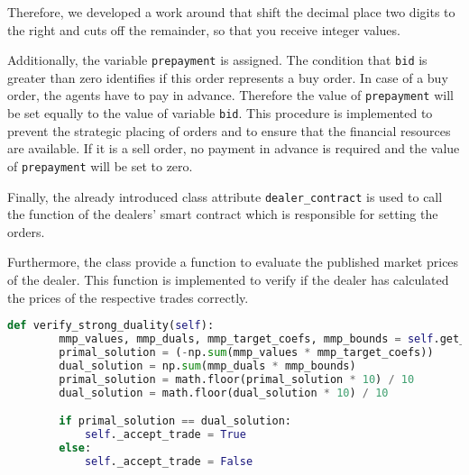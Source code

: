 Therefore, we developed a work around that shift the decimal place two digits to the right and cuts off the remainder,
so that you receive integer values. 

Additionally, the variable \verb|prepayment| is assigned. 
The condition that \verb|bid| is greater than zero identifies if this order represents a buy order.
In case of a buy order, the agents have to pay in advance.
Therefore the value of \verb|prepayment| will be set equally to the value of variable \verb|bid|. 
This procedure is implemented to prevent the strategic placing of orders and to ensure that the financial resources are available.
If it is a sell order, no payment in advance is required and the value of \verb|prepayment| will be set to zero.

Finally, the already introduced class attribute \verb|dealer_contract| is used to call the function of the dealers' smart contract which is
responsible for setting the orders.

Furthermore, the class provide a function to evaluate the published market prices of the dealer. 
This function is implemented to verify if the dealer has calculated the prices of the respective trades 
correctly.  

\begin{lstlisting}[float=htbp, label=lst:verify_trade, caption=Verification of trades, language=Python]
    def verify_strong_duality(self):
        mmp_values, mmp_duals, mmp_target_coefs, mmp_bounds = self.get_mmp_attributes()
        primal_solution = (-np.sum(mmp_values * mmp_target_coefs))
        dual_solution = np.sum(mmp_duals * mmp_bounds)
        primal_solution = math.floor(primal_solution * 10) / 10
        dual_solution = math.floor(dual_solution * 10) / 10

        if primal_solution == dual_solution:
            self._accept_trade = True
        else:
            self._accept_trade = False
\end{lstlisting}

